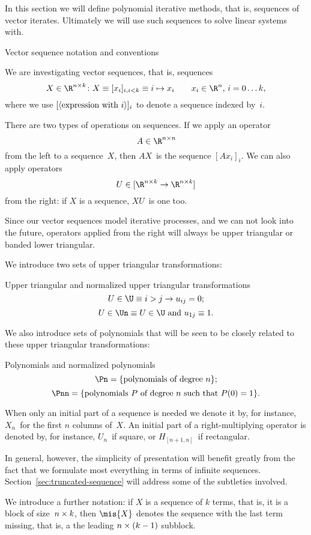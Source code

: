 In this section we will define polynomial iterative methods,
that is, sequences of vector iterates. Ultimately we will use such
sequences to solve linear systems with.

 {Vector sequence notation and conventions}

We are investigating vector sequences, that is, sequences
\[ X\in\R^{n\times k}\colon X\equiv [x_i]_{i,i<k}\equiv
    i\mapsto x_i\qquad\hbox{$x_i\in\R^n$, $i=0\ldots k$}, \]
where we use $[\langle\hbox{expression with $i$}\rangle]_i$ to denote
a sequence indexed by~$i$.

There are two types of operations on sequences.
If we apply an operator \[A\in\R^{n\times n}\] from the left to a sequence~$X$,
then $AX$~is the sequence $[Ax_i]_i$.
We can also apply operators 
\[ U\in[\R^{n\times k}\rightarrow\R^{n\times k}] \]
from the right: if $X$ is a sequence, $XU$~is one too. 

Since our vector sequences model iterative processes, and we can not
look into the future, operators applied from the right will always be
upper triangular or banded lower triangular.

We introduce two sets of upper triangular transformations:
\begin{ddefinition}{Upper triangular and normalized upper triangular transformations}
\[ U\in\U \equiv i>j\rightarrow u_{ij}=0; \]
\[ U\in\Un \equiv \hbox{$U\in\U$ and $u_{1j}\equiv 1$}. \]
\end{ddefinition}

We also introduce sets of polynomials that will be seen to be closely
related to these upper triangular transformations:
\begin{ddefinition}{Polynomials and normalized polynomials}
\[ \Pn=\{\hbox{polynomials of degree $n$}\}; \]
\[ \Pnn=\{\hbox{polynomials $P$ of degree $n$ such that $P(0)=1$}\}. \]
\end{ddefinition}

When only an initial part of a sequence is needed we denote it
by, for instance, $X_n$~for the first $n$ columns of~$X$.
An initial part of a right-multiplying operator is denoted
by, for instance, $U_n$~if square, or $H_{[n+1,n]}$~if rectangular.
\begin{truth}
  In general, however, the simplicity of presentation will benefit
  greatly from the fact that we formulate most everything in terms of
  infinite sequences. Section~\ref{sec:truncated-sequence} will
  address some of the subtleties involved.
\end{truth}
\begin{miss}
  We introduce a further notation: if $X$ is a sequence of $k$ terms,
  that is, it is a block of size~$n\times\nobreak k$, then $\mis{X}$
  denotes the sequence with the last term missing, that is, a the
  leading $n\times\nobreak(k-\nobreak1)$ subblock.
\end{miss}


